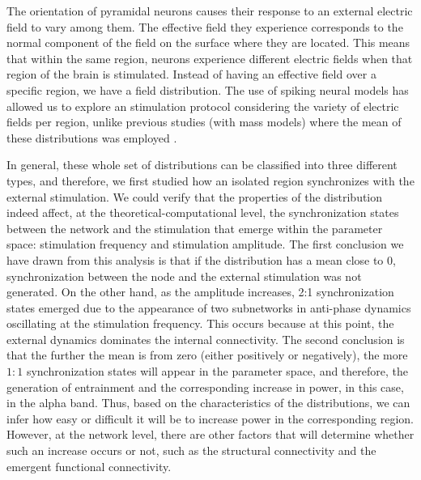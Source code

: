 \documentclass[../main.tex]{subfiles}
\begin{document}
The orientation of pyramidal neurons causes their response to an external electric field to vary among them.
The effective field they experience corresponds to the normal component of the field on the surface where they are located.
This means that within the same region, neurons experience different electric fields when that region of the brain is stimulated.
Instead of having an effective field over a specific region, we have a field distribution.
The use of spiking neural models has allowed us to explore an stimulation protocol considering the variety of electric fields per region, unlike previous studies (with mass models) where the mean of these distributions was employed \citep{merlet_oscillatory_2013}.

In general, these whole set of distributions can be classified into three different types, and therefore, we first studied how an isolated region synchronizes with the external stimulation.
We could verify that the properties of the distribution indeed affect, at the theoretical-computational level, the synchronization states between the network and the stimulation that emerge within the parameter space: stimulation frequency and stimulation amplitude.
The first conclusion we have drawn from this analysis is that if the distribution has a mean close to $0$, synchronization between the node and the external stimulation was not generated.
On the other hand, as the amplitude increases, 2:1 synchronization states emerged due to the appearance of two subnetworks in anti-phase dynamics oscillating at the stimulation frequency.
This occurs because at this point, the external dynamics dominates the internal connectivity.
The second conclusion is that the further the mean is from zero (either positively or negatively), the more $1:1$ synchronization states will appear in the parameter space, and therefore, the generation of entrainment and the corresponding increase in power, in this case, in the alpha band.
Thus, based on the characteristics of the distributions, we can infer how easy or difficult it will be to increase power in the corresponding region.
However, at the network level, there are other factors that will determine whether such an increase occurs or not, such as the structural connectivity and the emergent functional connectivity.
\end{document}
